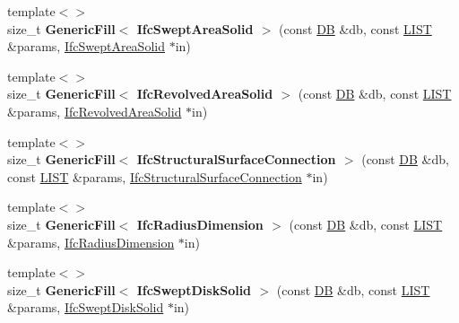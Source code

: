 \begin{DoxyCompactItemize}
\item 
\hypertarget{namespace_assimp_1_1_s_t_e_p_a9c94ce26954bc7241360711ac2265d44}{{\footnotesize template$<$$>$ }\\size\+\_\+t {\bfseries Generic\+Fill$<$ Ifc\+Swept\+Area\+Solid $>$} (const \hyperlink{class_assimp_1_1_s_t_e_p_1_1_d_b}{D\+B} \&db, const \hyperlink{class_assimp_1_1_s_t_e_p_1_1_e_x_p_r_e_s_s_1_1_l_i_s_t}{L\+I\+S\+T} \&params, \hyperlink{struct_assimp_1_1_i_f_c_1_1_ifc_swept_area_solid}{Ifc\+Swept\+Area\+Solid} $\ast$in)}\label{namespace_assimp_1_1_s_t_e_p_a9c94ce26954bc7241360711ac2265d44}

\item 
\hypertarget{namespace_assimp_1_1_s_t_e_p_a3efe926c761ef0496736c20073e9f2ea}{{\footnotesize template$<$$>$ }\\size\+\_\+t {\bfseries Generic\+Fill$<$ Ifc\+Revolved\+Area\+Solid $>$} (const \hyperlink{class_assimp_1_1_s_t_e_p_1_1_d_b}{D\+B} \&db, const \hyperlink{class_assimp_1_1_s_t_e_p_1_1_e_x_p_r_e_s_s_1_1_l_i_s_t}{L\+I\+S\+T} \&params, \hyperlink{struct_assimp_1_1_i_f_c_1_1_ifc_revolved_area_solid}{Ifc\+Revolved\+Area\+Solid} $\ast$in)}\label{namespace_assimp_1_1_s_t_e_p_a3efe926c761ef0496736c20073e9f2ea}

\item 
\hypertarget{namespace_assimp_1_1_s_t_e_p_ae9600a8a3efe30253e8cde8f8fe2f9ee}{{\footnotesize template$<$$>$ }\\size\+\_\+t {\bfseries Generic\+Fill$<$ Ifc\+Structural\+Surface\+Connection $>$} (const \hyperlink{class_assimp_1_1_s_t_e_p_1_1_d_b}{D\+B} \&db, const \hyperlink{class_assimp_1_1_s_t_e_p_1_1_e_x_p_r_e_s_s_1_1_l_i_s_t}{L\+I\+S\+T} \&params, \hyperlink{struct_assimp_1_1_i_f_c_1_1_ifc_structural_surface_connection}{Ifc\+Structural\+Surface\+Connection} $\ast$in)}\label{namespace_assimp_1_1_s_t_e_p_ae9600a8a3efe30253e8cde8f8fe2f9ee}

\item 
\hypertarget{namespace_assimp_1_1_s_t_e_p_aa448697b099e1dc28bf230a8b14b6363}{{\footnotesize template$<$$>$ }\\size\+\_\+t {\bfseries Generic\+Fill$<$ Ifc\+Radius\+Dimension $>$} (const \hyperlink{class_assimp_1_1_s_t_e_p_1_1_d_b}{D\+B} \&db, const \hyperlink{class_assimp_1_1_s_t_e_p_1_1_e_x_p_r_e_s_s_1_1_l_i_s_t}{L\+I\+S\+T} \&params, \hyperlink{struct_assimp_1_1_i_f_c_1_1_ifc_radius_dimension}{Ifc\+Radius\+Dimension} $\ast$in)}\label{namespace_assimp_1_1_s_t_e_p_aa448697b099e1dc28bf230a8b14b6363}

\item 
\hypertarget{namespace_assimp_1_1_s_t_e_p_ab553d17c6868dc5c2cdd76f91e53d692}{{\footnotesize template$<$$>$ }\\size\+\_\+t {\bfseries Generic\+Fill$<$ Ifc\+Swept\+Disk\+Solid $>$} (const \hyperlink{class_assimp_1_1_s_t_e_p_1_1_d_b}{D\+B} \&db, const \hyperlink{class_assimp_1_1_s_t_e_p_1_1_e_x_p_r_e_s_s_1_1_l_i_s_t}{L\+I\+S\+T} \&params, \hyperlink{struct_assimp_1_1_i_f_c_1_1_ifc_swept_disk_solid}{Ifc\+Swept\+Disk\+Solid} $\ast$in)}\label{namespace_assimp_1_1_s_t_e_p_ab553d17c6868dc5c2cdd76f91e53d692}


\end{DoxyCompactItemize}
